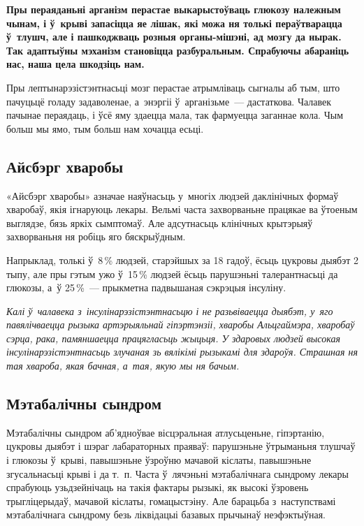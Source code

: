 \textbf{Пры пераяданьні арганізм перастае выкарыстоўваць глюкозу належным чынам, і ў~крыві запасіцца яе лішак, які можа ня толькі пераўтварацца ў~тлушч, але і пашкоджваць розныя органы-мішэні, ад мозгу да нырак. Так адаптыўны мэханізм становіцца разбуральным. Спрабуючы абараніць нас, наша цела шкодзіць нам.}

Пры лептынарэзістэнтнасьці мозг перастае атрымліваць сыгналы аб тым, што пачуцьцё голаду задаволенае, а~энэргіі ў~арганізьме~--- дастаткова. Чалавек пачынае пераядаць, і ўсё яму здаецца мала, так фармуецца заганнае кола. Чым больш мы ямо, тым больш нам хочацца есьці.

\subsection*{Айсбэрг хваробы}

«Айсбэрг хваробы» азначае наяўнасьць у~многіх людзей даклінічных формаў хваробаў, якія ігнаруюць лекары. Вельмі часта захворваньне працякае ва ўтоеным выглядзе, бязь яркіх сымптомаў. Але адсутнасьць клінічных крытэрыяў захворваньня ня робіць яго бяскрыўдным. 

Напрыклад, толькі ў~8\,\% людзей, старэйшых за 18 гадоў, ёсьць цукровы дыябэт 2 тыпу, але пры гэтым ужо ў~15\,\% людзей ёсьць парушэньні талерантнасьці да глюкозы, а~ў 25\,\%~--- прыкметна падвышаная сэкрэцыя інсуліну.


\emph{Калі ў~чалавека з~інсулінарэзістэнтнасьцю і не разьвіваецца дыябэт, у~яго павялічваецца рызыка артэрыяльнай гіпэртэнзіі, хваробы Альцгаймэра, хваробаў сэрца, рака, памяншаецца працягласьць жыцьця. У здаровых людзей высокая інсулінарэзістэнтнасьць злучаная зь вялікімі рызыкамі для здароўя. Страшная ня тая хвароба, якая бачная, а~тая, якую мы ня бачым.}

\subsection*{Мэтабалічны сындром}

Мэтабалічны сындром аб'ядноўвае вісцэральная атлусьценьне, гіпэртанію, цукровы дыябэт і шэраг лабараторных праяваў: парушэньне ўтрыманьня тлушчаў і глюкозы ў~крыві, павышэньне ўзроўню мачавой кіслаты, павышэньне згусальнасьці крыві і да т.~п. Часта ў~лячэньні мэтабалічнага сындрому лекары спрабуюць узьдзейнічаць на такія фактары рызыкі, як высокі ўзровень трыгліцерыдаў, мачавой кіслаты, гомацыстэіну. Але барацьба з~наступствамі мэтабалічнага сындрому безь ліквідацыі базавых прычынаў неэфэктыўная.

